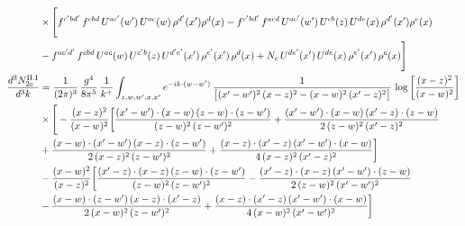 \documentclass[9pt]{article}
\numberwithin{equation}{section}
\begin{document}
\begin{align}
&\times\Bigg[f^{c^{\prime}bd^{\prime}}\,f^{cbd}\, U^{ac^{\prime}}(w^{\prime})\,U^{ac}(w)\,\rho^{d^{\prime}}(x^{\prime})\rho^{d}(x)- f^{c^{\prime}bd^{\prime}}\,f^{acd}\,U^{ac^{\prime}}(w^{\prime})\,U^{cb}(z)\,U^{de}(x)\,\rho^{d^{\prime}}(x^{\prime})\rho^{e}(x) \notag \\ & -f^{ac^{\prime}d^{\prime}}\,f^{cbd}\,U^{ac}(w)\,U^{c^{\prime}b}(z)\,U^{d^{\prime}e^{\prime}}(x^{\prime})\,\rho^{e^{\prime}}(x^{\prime})\,\rho^{d}(x) +N_{c}\,U^{de^{\prime}}(x^{\prime})\,U^{de}(x)\,\rho^{e^{\prime}}(x^{\prime})\,\rho^{e}(x)\Bigg]\\
\frac{d^{3}N^{\rm II.I}_{2c}}{d^{3}k} &= \frac{1}{(2\pi)^{3}}\,\frac{g^{4}}{8\pi^{5}}\,\frac{1}{k^{+}}\int_{z,w,w^{\prime},x,x^{\prime}}e^{-ik\cdot{(w-w^{\prime})}}\,\frac{1}{\big[(x^{\prime}-w^{\prime})^{2}\,(x-z)^{2}-(x-w)^{2}\,(x^{\prime}-z)^{2}\big]}\,\log\left[\frac{(x-z)^{2}}{(x-w)^{2}}\right]\notag\\
&\times\Bigg[-\frac{(x-z)^{2}}{(x-w)^{2}}\bigg[\frac{(x^{\prime}-w^{\prime})\cdot(x-w)\,(z-w)\cdot(z-w^{\prime})}{(z-w)^{2}\,(z-w^{\prime})^{2}}+\frac{(x^{\prime}-w^{\prime})\cdot(x-w)\,(x^{\prime}-z)\cdot(z-w)}{2\,(z-w)^{2}\,(x^{\prime}-z)^{2}}\notag \\ & +\frac{(x-w)\cdot(x^{\prime}-w^{\prime})\,(x-z)\cdot(z-w^{\prime})}{2\,(x-z)^{2}\,(z-w^{\prime})^{2}}+\frac{(x-z)\cdot(x^{\prime}-z)\,(x^{\prime}-w^{\prime})\cdot(x-w)}{4\,(x-z)^{2}\,(x^{\prime}-z)^{2}}\bigg]\notag\\
&-\frac{(x-w)^{2}}{(x-z)^{2}}\bigg[\frac{(x^{\prime}-z)\cdot(x-z)\,(z-w)\cdot(z-w^{\prime})}{(z-w)^{2}\,(z-w^{\prime})^{2}}-\frac{(x^{\prime}-z)\cdot(x-z)\,(x^{\prime}-w^{\prime})\cdot(z-w)}{2\,(z-w)^{2}\,(x^{\prime}-w^{\prime})^{2}}\notag \\ & -\frac{(x-w)\cdot(z-w^{\prime})\,(x-z)\cdot(x^{\prime}-z)}{2\,(x-w)^{2}\,(z-w^{\prime})^{2}}+\frac{(x-z)\cdot(x^{\prime}-z)\,(x^{\prime}-w^{\prime})\cdot(x-w)}{4\,(x-w)^{2}\,(x^{\prime}-w^{\prime})^{2}}\bigg]\notag\\

\end{align}
\end{document}
